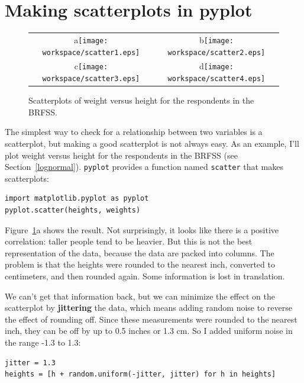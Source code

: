 \documentclass[12pt]{book}
\begin{document}
\section{Making scatterplots in pyplot}


\begin{figure}
\centering
\begin{tabular}{cc}
a\texttt{[image: workspace/scatter1.eps]} &
b\texttt{[image: workspace/scatter2.eps]} \\
c\texttt{[image: workspace/scatter3.eps]} &
d\texttt{[image: workspace/scatter4.eps]} \\ 
\end{tabular}
\caption{Scatterplots of weight versus height for the respondents
in the BRFSS.}
\label{scatterplots}
\end{figure}


The simplest way to check for a relationship between two variables
is a scatterplot, but making a good scatterplot is not always easy.
As an example, I'll plot weight versus height for the respondents
in the BRFSS (see Section~\ref{lognormal}).  {\tt pyplot} provides
a function named {\tt scatter} that makes scatterplots:

\begin{verbatim}
import matplotlib.pyplot as pyplot
pyplot.scatter(heights, weights)
\end{verbatim}

Figure~\ref{scatterplots}a shows the result.  Not surprisingly, it
looks like there is a positive correlation: taller people tend to be
heavier.  But this is not the best representation of the data, because
the data are packed into columns.  The problem is that the heights
were rounded to the nearest inch, converted to centimeters, and
then rounded again.  Some information is lost in translation.


We can't get that information back, but we can minimize the effect on
the scatterplot by {\bf jittering} the data, which means adding random
noise to reverse the effect of rounding off.  Since these measurements
were rounded to the nearest inch, they can be off by up to 0.5 inches or
1.3 cm.  So I added uniform noise in the range -1.3 to 1.3:

\begin{verbatim}
jitter = 1.3
heights = [h + random.uniform(-jitter, jitter) for h in heights]
\end{verbatim}
\end{document}
